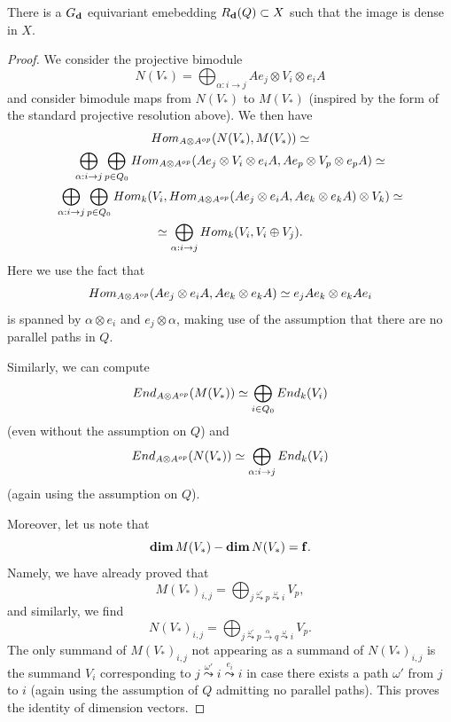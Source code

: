 \documentclass[10pt,a4paper]{amsart}
\begin{document}
\begin{thm}
There is a $G_{\bf d}$ equivariant emebedding $R_{\bf d}(Q)\subset X$ such that 
the image is dense in $X$.
\end{thm}

\begin{proof}
We consider the projective bimodule
$$N(V_*)=\bigoplus_{\alpha:i\rightarrow j}Ae_j\otimes V_i\otimes e_iA$$
and consider bimodule maps from $N(V_*)$ to $M(V_*)$ (inspired by the form of the standard projective resolution above).
We then have
\begin{multline*}
{\rm Hom}_{A\otimes A^{\rm op}}(N(V_*),M(V_*))\simeq\\
\bigoplus_{\alpha:i\rightarrow j}\bigoplus_{p\in Q_0}{\rm Hom}_{A\otimes A^{\rm op}}(Ae_j\otimes V_i\otimes e_iA,Ae_p\otimes V_p\otimes e_pA)\simeq\\
\bigoplus_{\alpha:i\rightarrow j}\bigoplus_{p\in Q_0}{\rm Hom}_k(V_i,{\rm Hom}_{A\otimes A^{\rm op}}(Ae_j\otimes e_iA,Ae_k\otimes e_kA)\otimes V_k)\simeq\\
\simeq\bigoplus_{\alpha:i\rightarrow j}{\rm Hom}_k(V_i, V_i\oplus V_j).
\end{multline*}
Here we use the fact that $${\rm Hom}_{A\otimes A^{\rm op}}(Ae_j\otimes e_iA,Ae_k\otimes e_kA)\simeq e_jAe_k\otimes e_kAe_i$$
is spanned by $\alpha\otimes e_i$ and $e_j\otimes \alpha$, making use of the assumption that there are no parallel paths in $Q$.

Similarly, we can compute
$${\rm End}_{A\otimes A^{\rm op}}(M(V_*))\simeq\bigoplus_{i\in Q_0}{\rm End}_k(V_i)$$
(even without the assumption on $Q$) and
$${\rm End}_{A\otimes A^{\rm op}}(N(V_*))\simeq\bigoplus_{\alpha:i\rightarrow j}{\rm End}_k(V_i)$$
(again using the assumption on $Q$).

Moreover, let us note that 
$${\rm\bf dim}\, M(V_*)-{\rm\bf dim}\, N(V_*)={\bf f}.$$
Namely, we have already proved that
$$M(V_*)_{i,j}=\bigoplus_{j\stackrel{\omega'}{\leadsto}p\stackrel{\omega}{\leadsto}i}V_p,$$
and similarly, we find
$$N(V_*)_{i,j}=\bigoplus_{j\stackrel{\omega'}{\leadsto}p\stackrel{\alpha}{\rightarrow}q\stackrel{\omega}{\leadsto}i}V_p.$$
The only summand of $M(V_*)_{i,j}$ not appearing as a summand of $N(V_*)_{i,j}$ is the summand $V_i$ corresponding to $j\stackrel{\omega'}{\leadsto}i\stackrel{e_i}{\leadsto}i$ in case there exists a path $\omega'$ from $j$ to $i$ (again using the assumption of $Q$ admitting no parallel paths). This proves the identity of dimension vectors.


\end{proof}
\end{document}
